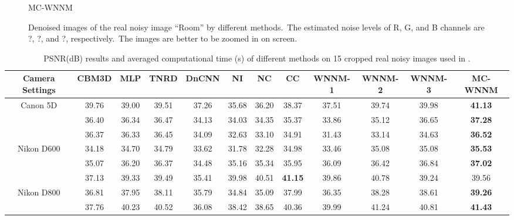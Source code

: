 \begin{figure}
{\begin{minipage}[t]{0.19\textwidth}
{\footnotesize MC-WNNM }
\end{minipage}
}
    \caption{Denoised images of the real noisy image ``Room'' \cite{ncwebsite} by different methods.\ The estimated noise levels of R, G, and B channels are ?, ?, and ?, respectively.\ The images are better to be zoomed in on screen.}
    \label{fig4-12}
\end{figure}




\begin{table}
\begin{adjustwidth}{-2cm}{}
\caption{PSNR(dB) results and averaged computational time (s) of different methods on 15 cropped real noisy images used in \cite{crosschannel2016}.}
\label{tab4-4}
\label{tabb}
\begin{center}
\renewcommand\arraystretch{1}
\scriptsize
\begin{tabular}{|c||c|c|c|c|c|c|c|c|c|c|c|}
\hline
Camera Settings  
&
\textbf{CBM3D}
&
\textbf{MLP}
&
\textbf{TNRD}
&
\textbf{DnCNN}
&
\textbf{NI}
&
\textbf{NC}
&
\textbf{CC}
&
\textbf{WNNM-1}
&
\textbf{WNNM-2}
&
\textbf{WNNM-3}
&
\textbf{MC-WNNM} 
\\
\hline
\multirow{3}{*}{\small{Canon 5D}} %
& 39.76 & 39.00 & 39.51 & 37.26 & 35.68 & 36.20 & 38.37 & 37.51 & 39.74 & 39.98 & \textbf{41.13}
\\ 
\cline{2-12} 
\multirow{3}{*}{ISO = 3200}   
& 36.40 & 36.34 & 36.47 & 34.13 & 34.03 & 34.35 & 35.37 & 33.86 & 35.12 & 36.65 & \textbf{37.28}
\\ 
\cline{2-12}    
& 36.37 & 36.33 & 36.45 & 34.09 & 32.63 & 33.10 & 34.91 & 31.43 & 33.14 & 34.63 & \textbf{36.52}  
\\
\hline
\multirow{3}{*}{Nikon D600} 
& 34.18 & 34.70 & 34.79 & 33.62 & 31.78 & 32.28 & 34.98 & 33.46 & 35.08 & 35.08 & \textbf{35.53}
\\ 
\cline{2-12} 
\multirow{3}{*}{ISO = 3200}   
& 35.07 & 36.20 & 36.37 & 34.48 & 35.16 & 35.34 & 35.95 & 36.09 & 36.42 & 36.84 & \textbf{37.02}
\\ 
\cline{2-12}    
& 37.13 & 39.33 & 39.49 & 35.41 & 39.98 & 40.51 & \textbf{41.15} & 39.86 & 40.78 & 39.24 & 39.56
\\
\hline
\multirow{3}{*}{Nikon D800} 
& 36.81  & 37.95 & 38.11 & 35.79 & 34.84 & 35.09 & 37.99 & 36.35 & 38.28 & 38.61 & \textbf{39.26}
\\ 
\cline{2-12} 
\multirow{3}{*}{ISO = 1600}   
& 37.76 & 40.23 & 40.52 & 36.08 & 38.42 & 38.65 & 40.36 & 39.99 & 41.24 & 40.81 & \textbf{41.43}
\\ 

\end{tabular}
\end{center}
\end{adjustwidth}
\end{table}
